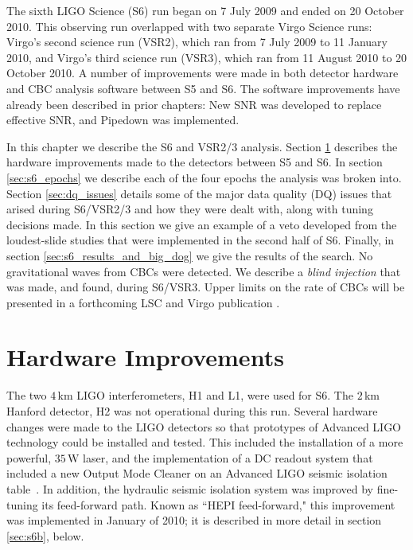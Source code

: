 
\def\firstFAR{\ensuremath{\mathrm{2.2~yr^{-1}}}}
\def\secondFAR{\ensuremath{\mathrm{5.6~yr^{-1}}}}
\def\thirdFAR{\ensuremath{\mathrm{9.4~yr^{-1}}}}
\def\expectedLoudestFAR{\ensuremath{\mathrm{\sim2~yr^{-1}}}}
\def\dogDate{16 September 2010}
\def\injectedDogTime{06:42:23 UTC}
\def\injectedDogGPSTime{968654558.0}

The sixth \ac{LIGO} Science (S6) run began on 7 July 2009 and ended on 20
October 2010. This observing run overlapped with two separate Virgo Science
runs: Virgo's second science run (VSR2), which ran from 7 July 2009 to 11
January 2010, and Virgo's third science run (VSR3), which ran from 11 August
2010 to 20 October 2010. A number of improvements were made in both detector
hardware and \ac{CBC} analysis software between \ac{S5} and \ac{S6}. The
software improvements have already been described in prior chapters: New
\ac{SNR} was developed to replace effective \ac{SNR}, and Pipedown was
implemented.

In this chapter we describe the \ac{S6} and VSR2/3 analysis. Section
\ref{sec:hardware_improvements} describes the hardware improvements made to the
detectors between \ac{S5} and \ac{S6}. In section \ref{sec:s6_epochs} we
describe each of the four epochs the analysis was broken into. Section
\ref{sec:dq_issues} details some of the major data quality (DQ) issues that
arised during S6/VSR2/3 and how they were dealt with, along with tuning
decisions made. In this section we give an example of a veto developed from the
loudest-slide studies that were implemented in the second half of \ac{S6}.
Finally, in section \ref{sec:s6_results_and_big_dog} we give the results of the
search. No gravitational waves from \acp{CBC} were detected. We describe a
\emph{blind injection} that was made, and found, during S6/VSR3.  Upper limits
on the rate of \acp{CBC} will be presented in a forthcoming \ac{LSC} and Virgo
publication \cite{Collaboration:S6CBClowmass}.

\section{Hardware Improvements}
\label{sec:hardware_improvements}

The two $4\,$km \ac{LIGO} interferometers, H1 and L1, were used for \ac{S6}.
The $2\,$km Hanford detector, H2 was not operational during this run. Several
hardware changes were made to the \ac{LIGO} detectors so that prototypes of
Advanced LIGO technology could be installed and tested. This included the
installation of a more powerful, $35\,\mathrm{W}$ laser, and the implementation
of a DC readout system that included a new Output Mode Cleaner on an Advanced
LIGO seismic isolation table~\cite{Adhikari:2006}. In addition, the hydraulic
seismic isolation system was improved by fine-tuning its feed-forward path.
Known as ``HEPI feed-forward," this improvement was implemented in January of
2010; it is described in more detail in section \ref{sec:s6b}, below.

